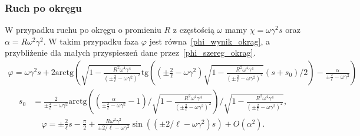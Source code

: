 \subsubsection{Ruch po okręgu}
W przypadku ruchu po okręgu o promieniu $R$ z 
częstością $\omega$ mamy
$\chi = \omega \gamma^2 s$ oraz 
$\alpha = R\omega^2\gamma^2 $.
W takim przypadku faza $\varphi$ jest 
równa~\eqref{phi_wynik_okrag}, a 
przybliżenie dla małych przyspieszeń dane 
przez~\eqref{phi_szereg_okrag}.
\begin{align}\label{phi_wynik_okrag}
\varphi = \omega\gamma^2 s +  
2\text{arctg} \left( 
\sqrt{ 1-\frac{R^2\omega^4\gamma^4}{\left( \pm \frac{2}{\ell} 
-\omega\gamma^2 \right)^2 } }
\text{tg} \left( 
\left( \pm \frac{2}{\ell} -\omega\gamma^2 \right)
\sqrt{ 1-\frac{R^2\omega^4\gamma^4}{\left( \pm \frac{2}{\ell} 
-\omega\gamma^2 \right)^2 } }(s + s_0)/2
\right)  
- \frac{\alpha}{\pm \frac{2}{\ell} -\omega\gamma^2}
\right)
\end{align}
\begin{align*}
s_0 & = \frac{2}{\pm \frac{2}{\ell} -\omega\gamma^2} 
\text{arctg}  
\left( \left( \frac{\alpha}{\pm \frac{2}{\ell} 
-\omega\gamma^2} - 1 \right) \Big /  
\sqrt{ 1-\frac{R^2\omega^4\gamma^4}{\left( \pm \frac{2}{\ell} 
-\omega\gamma^2 \right)^2 } }
\right)\Big /   
\sqrt{ 1-\frac{R^2\omega^4\gamma^4}{\left( \pm \frac{2}{\ell} 
-\omega\gamma^2 \right)^2 } },
\end{align*}
\begin{align}\label{phi_szereg_okrag}
\varphi =  \pm \frac{2}{\ell}s - \frac{\pi}{2} 
+
\frac{R \omega^2 \gamma^2}{\pm 2/\ell - \omega\gamma^2}
\sin ( (\pm 2/\ell - \omega\gamma^2) s )  
+O(\alpha^2).
\end{align}

\newpage
